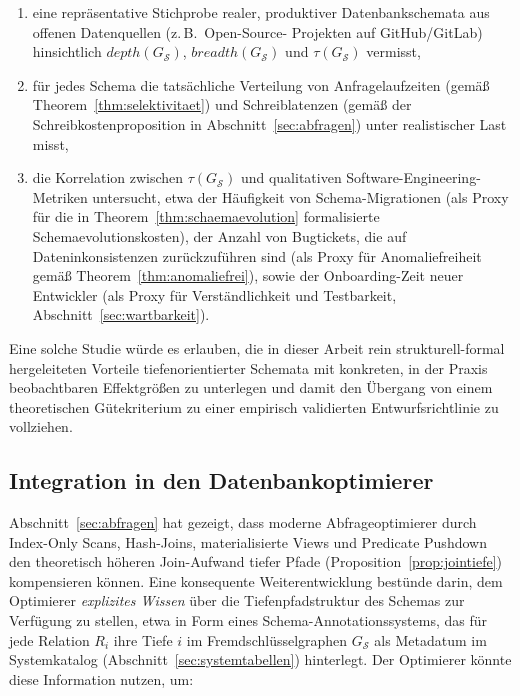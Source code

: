﻿\documentclass[a4paper,12pt]{report}
\theoremstyle{definition}
\theoremstyle{remark}
\newcommand{\depth}{\mathit{depth}}
\newcommand{\breadth}{\mathit{breadth}}
\begin{document}
\begin{enumerate}
  \item eine repräsentative Stichprobe realer, produktiver
    Datenbankschemata aus offenen Datenquellen (z.\,B.\ Open-Source-
    Projekten auf GitHub/GitLab) hinsichtlich $\depth(G_{\mathcal{S}})$,
    $\breadth(G_{\mathcal{S}})$ und $\tau(G_{\mathcal{S}})$ vermisst,
  \item für jedes Schema die tatsächliche Verteilung von
    Anfragelaufzeiten (gemäß Theorem~\ref{thm:selektivitaet}) und
    Schreiblatenzen (gemäß der Schreibkostenproposition in
    Abschnitt~\ref{sec:abfragen}) unter realistischer Last misst,
  \item die Korrelation zwischen $\tau(G_{\mathcal{S}})$ und
    qualitativen Software-Engineering-Metriken untersucht, etwa der
    Häufigkeit von Schema-Migrationen (als Proxy für die in
    Theorem~\ref{thm:schaemaevolution} formalisierte
    Schemaevolutionskosten), der Anzahl von Bugtickets, die auf
    Dateninkonsistenzen zurückzuführen sind (als Proxy für
    Anomaliefreiheit gemäß Theorem~\ref{thm:anomaliefrei}), sowie der
    Onboarding-Zeit neuer Entwickler (als Proxy für
    Verständlichkeit und Testbarkeit, Abschnitt~\ref{sec:wartbarkeit}).
\end{enumerate}

Eine solche Studie würde es erlauben, die in dieser Arbeit rein
strukturell-formal hergeleiteten Vorteile tiefenorientierter Schemata
mit konkreten, in der Praxis beobachtbaren Effektgrößen zu
unterlegen und damit den Übergang von einem theoretischen
Gütekriterium zu einer empirisch validierten Entwurfsrichtlinie zu
vollziehen.

\subsection{Integration in den Datenbankoptimierer}
\label{sec:ausblick-optimizer}

Abschnitt~\ref{sec:abfragen} hat gezeigt, dass moderne
Abfrageoptimierer durch Index-Only Scans, Hash-Joins, materialisierte
Views und Predicate Pushdown den theoretisch höheren Join-Aufwand
tiefer Pfade (Proposition~\ref{prop:jointiefe}) kompensieren können.
Eine konsequente Weiterentwicklung bestünde darin, dem Optimierer
\emph{explizites Wissen} über die Tiefenpfadstruktur des Schemas zur
Verfügung zu stellen, etwa in Form eines Schema-Annotationssystems, das
für jede Relation $R_i$ ihre Tiefe $i$ im Fremdschlüsselgraphen
$G_{\mathcal{S}}$ als Metadatum im Systemkatalog
(Abschnitt~\ref{sec:systemtabellen}) hinterlegt. Der Optimierer könnte
diese Information nutzen, um:
\end{document}

